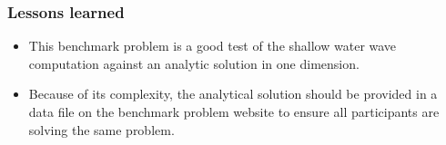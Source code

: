 \subsubsection{Lessons learned}

\begin{itemize}
\item This benchmark problem is a good test of the shallow water wave computation against an analytic solution in one dimension.
\item Because of its complexity, the analytical solution should be provided in a data file on the benchmark problem website to ensure all participants are solving the same problem.
\end{itemize}
